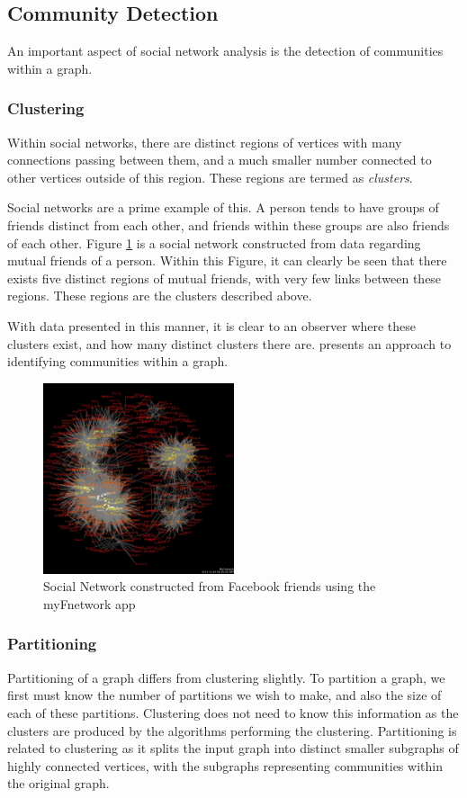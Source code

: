 \subsection{Community Detection}
An important aspect of social network analysis is the detection of communities within a graph.

\subsubsection{Clustering}
Within social networks, there are distinct regions of vertices with many connections passing between them, and a much smaller number connected to other vertices outside of this region. These regions are termed as \emph{clusters}.

Social networks are a prime example of this. A person tends to have groups of friends distinct from each other, and friends within these groups are also friends of each other. Figure \ref{fig:socialnetwork} is a social network constructed from data regarding mutual friends of a person. Within this Figure, it can clearly be seen that there exists five distinct regions of mutual friends, with very few links between these regions. These regions are the clusters described above.

With data presented in this manner, it is clear to an observer where these clusters exist, and how many distinct clusters there are. \cite{girvan02} presents an approach to identifying communities within a graph.

\begin{figure}[htbp]
\centering
\includegraphics[width=0.5\textwidth]{./img/socialnetwork.png}
\caption{Social Network constructed from Facebook friends using the myFnetwork app}
\label{fig:socialnetwork}
\end{figure}

\subsubsection{Partitioning}
Partitioning of a graph differs from clustering slightly. To partition a graph, we first must know the number of partitions we wish to make, and also the size of each of these partitions. Clustering does not need to know this information as the clusters are produced by the algorithms performing the clustering. Partitioning is related to clustering as it splits the input graph into distinct smaller subgraphs of highly connected vertices, with the subgraphs representing communities within the original graph.

